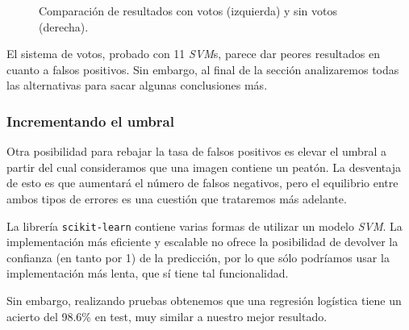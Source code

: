 \documentclass[11pt,a4paper]{article}
\begin{document}
\begin{figure}[H]
\begin{center}
    				\end{center}
    				\caption{Comparación de resultados con votos (izquierda) y sin votos (derecha).}

    			\end{figure}

                \par
                El sistema de votos, probado con 11 \textit{SVM}s, parece dar peores resultados en cuanto a falsos positivos. Sin embargo, al final de la sección analizaremos todas las alternativas para sacar algunas conclusiones más.

            \subsubsection{Incrementando el umbral}

                \par
                Otra posibilidad para rebajar la tasa de falsos positivos es elevar el umbral a partir del cual consideramos que una imagen contiene un peatón. La desventaja de esto es que aumentará el número de falsos negativos, pero el equilibrio entre ambos tipos de errores es una cuestión que trataremos más adelante.

                \par
                La librería \texttt{scikit-learn} contiene varias formas de utilizar un modelo \textit{SVM}. La implementación más eficiente y escalable no ofrece la posibilidad de devolver la confianza (en tanto por 1) de la predicción, por lo que sólo podríamos usar la implementación más lenta, que sí tiene tal funcionalidad.

                \par
                Sin embargo, realizando pruebas obtenemos que una regresión logística tiene un acierto del 98.6\% en test, muy similar a nuestro mejor resultado.
\end{document}

